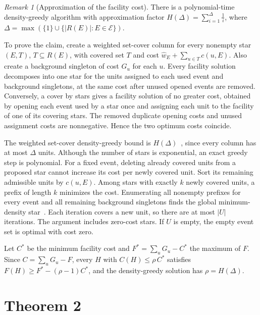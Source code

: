 \documentclass[10pt]{article}
\newcommand{\E}{\mathcal{E}}
\theoremstyle{plain}
\theoremstyle{remark}
\newtheorem{remark}{Remark}
\begin{document}
\begin{remark}[Approximation of the facility cost]
There is a polynomial-time density-greedy algorithm with approximation factor $H(\Delta)=\sum_{i=1}^{\Delta}\tfrac{1}{i}$, where $\Delta=\max(\{1\}\cup\{|R(E)|:E\in\E\})$.

To prove the claim, create a weighted set-cover column for every nonempty star $(E,T)$, $T\subseteq R(E)$, with covered set $T$ and cost $\hat w_E+\sum_{u\in T}c(u,E)$. Also create a background singleton of cost $G_u$ for each $u$. Every facility solution decomposes into one star for the units assigned to each used event and background singletons, at the same cost after unused opened events are removed. Conversely, a cover by stars gives a facility solution of no greater cost, obtained by opening each event used by a star once and assigning each unit to the facility of one of its covering stars. The removed duplicate opening costs and unused assignment costs are nonnegative. Hence the two optimum costs coincide.

The weighted set-cover density-greedy bound is $H(\Delta)$~\cite{Chvatal79}, since every column has at most $\Delta$ units. Although the number of stars is exponential, an exact greedy step is polynomial. For a fixed event, deleting already covered units from a proposed star cannot increase its cost per newly covered unit. Sort its remaining admissible units by $c(u,E)$. Among stars with exactly $k$ newly covered units, a prefix of length $k$ minimizes the cost. Enumerating all nonempty prefixes for every event and all remaining background singletons finds the global minimum-density star~\cite{Hochbaum82}. Each iteration covers a new unit, so there are at most $|U|$ iterations. The argument includes zero-cost stars. If $U$ is empty, the empty event set is optimal with cost zero.

Let $C^*$ be the minimum facility cost and $F^*=\sum_uG_u-C^*$ the maximum of $F$. Since $C=\sum_uG_u-F$, every $H$ with $C(H)\le\rho\,C^*$ satisfies $F(H)\ge F^*-(\rho-1)C^*$, and the density-greedy solution has $\rho=H(\Delta)$.
\end{remark}

\section{Theorem 2}
\label{sec:s-interface}
\end{document}
